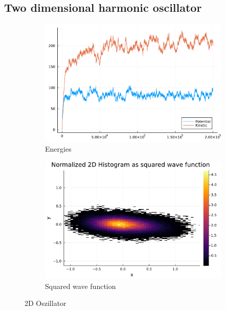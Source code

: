 \documentclass[
	a4paper, %
	10pt, %
]{CSUniSchoolLabReport}
\begin{document}
\subsection{Two dimensional harmonic oscillator}

\begin{figure}[H]
	\begin{subfigure}[b]{0.49\textwidth}
		\centering
		\includegraphics[width=\textwidth]{../saves/task3c.energies.pdf}
		\caption{Energies}
	\end{subfigure}
	\hfill
	\begin{subfigure}[b]{0.49\textwidth}
		\centering
		\includegraphics[width=\textwidth]{../saves/task3c.hist.pdf}
		\caption{Squared wave function}
	\end{subfigure}
	\caption{2D Oszillator}
	\label{fig:harmon2d}
\end{figure}
\end{document}
